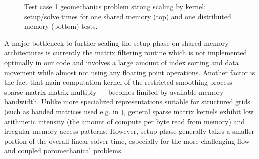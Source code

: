 \begin{figure} [htbp]
  \begin{subfigure}[t]{0.48\textwidth}
    \centering
    
  \end{subfigure}
  \hfill
  \begin{subfigure}[t]{0.48\textwidth}
    \centering
    
  \end{subfigure}
  \begin{subfigure}[t]{0.48\textwidth}
    \centering
    
  \end{subfigure}
  \hfill
  \begin{subfigure}[t]{0.48\textwidth}
    \centering
    
  \end{subfigure}
  \caption[Test case 1 geomechanics problem kernel scaling]{Test case 1 geomechanics problem strong scaling by kernel: setup/solve times for one shared memory (top) and one distributed memory (bottom) tests.}
  \label{fig:cart_scaling_strong_mech_kernels}
\end{figure}

A major bottleneck to further scaling the setup phase on shared-memory architectures is currently the matrix filtering routine which is not implemented optimally in our code and involves a large amount of index sorting and data movement while almost not using any floating point operations.   Another factor is the fact that main computation kernel of the restricted smoothing process --- sparse matrix-matrix multiply --- becomes limited by available memory bandwidth.   Unlike more specialized representations suitable for structured grids (such as banded matrices used e.g. in \cite{Manea2015,Manea2016}), general sparse matrix kernels exhibit low  arithmetic intensity (the amount of compute per byte read from memory) and irregular memory access patterns.    However, setup phase generally takes a smaller portion of the overall linear solver time, especially for the more challenging flow and coupled poromechanical problems.

